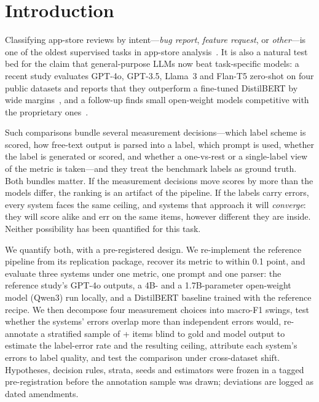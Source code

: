 \documentclass[sigconf,anonymous,review]{acmart}
\newcommand{\fone}{macro-F1\xspace}
\begin{document}

\maketitle

\section{Introduction}

Classifying app-store reviews by intent---\emph{bug report}, \emph{feature request}, or \emph{other}---is one of the oldest supervised tasks in app-store analysis~\cite{guzman2015,maalej2016,jha2018,scalabrino2019}. It is also a natural test bed for the claim that general-purpose LLMs now beat task-specific models: a recent study evaluates GPT-4o, GPT-3.5, Llama~3 and Flan-T5 zero-shot on four public datasets and reports that they outperform a fine-tuned DistilBERT by wide margins~\cite{abedini2025}, and a follow-up finds small open-weight models competitive with the proprietary ones~\cite{mallya2025}.

Such comparisons bundle several measurement decisions---which label scheme is scored, how free-text output is parsed into a label, which prompt is used, whether the label is generated or scored, and whether a one-vs-rest or a single-label view of the metric is taken---and they treat the benchmark labels as ground truth. Both bundles matter. If the measurement decisions move scores by more than the models differ, the ranking is an artifact of the pipeline. If the labels carry errors, every system faces the same ceiling, and systems that approach it will \emph{converge}: they will score alike and err on the same items, however different they are inside. Neither possibility has been quantified for this task.

We quantify both, with a pre-registered design. We re-implement the reference pipeline from its replication package, recover its metric to within 0.1 point, and evaluate three systems under one metric, one prompt and one parser: the reference study's GPT-4o outputs, a 4B- and a 1.7B-parameter open-weight model (Qwen3) run locally, and a DistilBERT baseline trained with the reference recipe. We then decompose four measurement choices into \fone swings, test whether the systems' errors overlap more than independent errors would, re-annotate a stratified sample of \nDSthree{}+\nDSfour{} items blind to gold and model output to estimate the label-error rate and the resulting ceiling, attribute each system's errors to label quality, and test the comparison under cross-dataset shift. Hypotheses, decision rules, strata, seeds and estimators were frozen in a tagged pre-registration before the annotation sample was drawn; deviations are logged as dated amendments.
\end{document}

